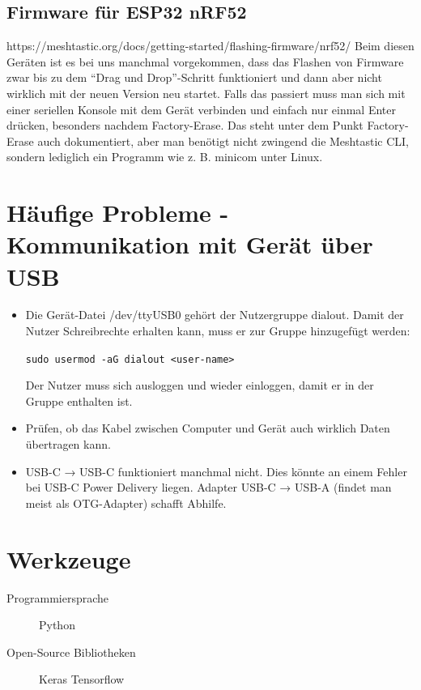 \documentclass[12pt,a4paper]{article}
\begin{document}
\subsection{Firmware für ESP32 nRF52}
https://meshtastic.org/docs/getting-started/flashing-firmware/nrf52/ Beim diesen Geräten ist es bei uns manchmal vorgekommen, dass das Flashen von Firmware zwar bis zu dem “Drag und Drop”-Schritt funktioniert und dann aber nicht wirklich mit der neuen Version neu startet. Falls das passiert muss man sich mit einer seriellen Konsole mit dem Gerät verbinden und einfach nur einmal Enter drücken, besonders nachdem Factory-Erase. Das steht unter dem Punkt Factory-Erase auch dokumentiert, aber man benötigt nicht zwingend die Meshtastic CLI, sondern lediglich ein Programm wie z. B. minicom unter Linux.

\section{Häufige Probleme - Kommunikation mit Gerät über USB}
\begin{itemize}
	\item Die Gerät-Datei /dev/ttyUSB0 gehört der Nutzergruppe dialout. Damit der Nutzer Schreibrechte erhalten kann, muss er zur Gruppe hinzugefügt werden:
	
	\lstinline{sudo usermod -aG dialout <user-name>}
	
	Der Nutzer muss sich ausloggen und wieder einloggen, damit er in der Gruppe enthalten ist.
	\item Prüfen, ob das Kabel zwischen Computer und Gerät auch wirklich Daten übertragen kann.
	\item USB-C → USB-C funktioniert manchmal nicht. Dies könnte an einem Fehler bei USB-C Power Delivery liegen. Adapter USB-C → USB-A (findet man meist als OTG-Adapter) schafft Abhilfe.
\end{itemize}

\section{Werkzeuge}
\begin{description}


    \item [Programmiersprache]\tab Python
    \item [Open-Source Bibliotheken]\tab Keras \newline \tab \tab Tensorflow
 
 
\end{description}
\end{document}
